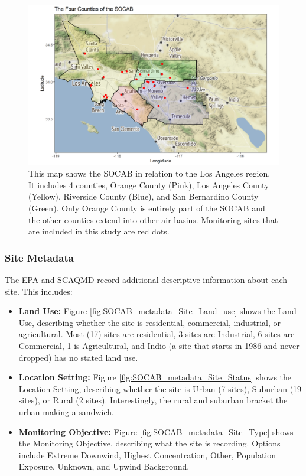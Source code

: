 \documentclass{article}
\begin{document}
\begin{figure}[ht]
    \centering
    \includegraphics[width = \textwidth]{Figures/SOCAB_counties.png}
    \caption{This map shows the \ac{SOCAB} in relation to the Los Angeles region.  It includes 4 counties, Orange County (Pink), Los Angeles County (Yellow), Riverside County (Blue), and San Bernardino County (Green).  Only Orange County is entirely part of the \ac{SOCAB} and the other counties extend into other air basins.  Monitoring sites that are included in this study are red dots.}
    \label{fig:SOCAB_counties}
\end{figure}

\subsubsection*{Site Metadata}
\label{subsubsec:sitemetadata}
The \ac{EPA} and \ac{SCAQMD} record additional descriptive information about each site.  This includes:  

\begin{itemize}
    \item \textbf{Land Use:} Figure  \ref{fig:SOCAB_metadata_Site_Land_use} shows the Land Use, describing whether the site is residential, commercial, industrial, or agricultural.  Most (17) sites are residential, 3 sites are Industrial, 6 sites are Commercial, 1 is Agricultural, and Indio (a site that starts in 1986 and never dropped) has no stated land use.

    \item \textbf{Location Setting:} Figure  \ref{fig:SOCAB_metadata_Site_Status} shows the Location Setting, describing whether the site is Urban (7 sites), Suburban (19 sites), or Rural (2 sites).  Interestingly, the rural and suburban bracket the urban making a sandwich.  

      \item \textbf{Monitoring Objective:} Figure  \ref{fig:SOCAB_metadata_Site_Type} shows the Monitoring Objective, describing what the site is recording.  Options include Extreme Downwind, Highest Concentration, Other, Population Exposure, Unknown, and Upwind Background.   
\end{itemize}
\end{document}
